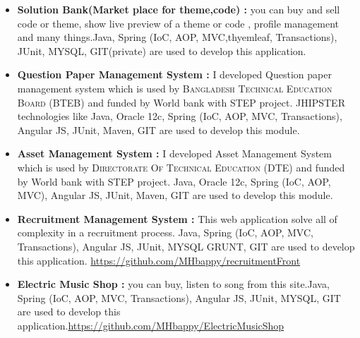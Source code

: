

\begin{cvparagraph}
	
	\begin{itemize}
		
		\item \textbf{Solution Bank(Market place for theme,code) : }you can buy and sell code or theme, show live preview of a theme or code , profile management and many things.Java, Spring (IoC, AOP, MVC,thyemleaf, Transactions), JUnit, MYSQL, GIT(private) are used to develop this application.
		
		
		\item \textbf{Question Paper Management System : }I developed Question paper management system which is used by \textsc{Bangladesh Technical Education Board (BTEB)} and funded by World bank with STEP project. JHIPSTER technologies like Java, Oracle 12c, Spring (IoC, AOP, MVC, Transactions), Angular JS, JUnit, Maven, GIT are used to develop this module.
		
		
		\item \textbf{Asset Management System :} I developed Asset Management System which is used by \textsc{Directorate Of Technical Education (DTE)} and funded by World bank with STEP project. Java, Oracle 12c, Spring (IoC, AOP, MVC), Angular JS, JUnit, Maven, GIT are used to develop this module.
		
		\item \textbf{Recruitment Management System : } This web application solve all of complexity in a recruitment process. Java, Spring (IoC, AOP, MVC, Transactions), Angular JS, JUnit, MYSQL GRUNT, GIT are used to develop this application. \underline{https://github.com/MHbappy/recruitmentFront}
		
		\item \textbf{Electric Music Shop : } you can buy, listen to song from this site.Java, Spring (IoC, AOP, MVC, Transactions), Angular JS, JUnit, MYSQL, GIT are used to develop this application.\underline{https://github.com/MHbappy/ElectricMusicShop}
		

\end{itemize}
\end{cvparagraph}

